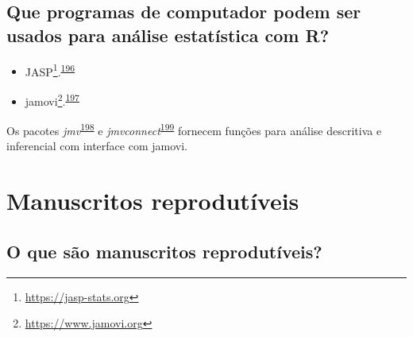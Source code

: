 \documentclass[
  a4paper,
]{book}
\renewcommand{\href}[2]{#2\footnote{\url{#1}}}
\newenvironment{infobox}[1]
  {
  \begin{itemize}
  \renewcommand{\labelitemi}{
    \raisebox{-.7\height}[0pt][0pt]{
      {\setkeys{Gin}{width=3em,keepaspectratio}
        \texttt{[image: \#1]}}
    }
  }
  \setlength{\fboxsep}{1em}
  \begin{blackbox}
  \item
  }
  {
  \end{blackbox}
  \end{itemize}
  }
\begin{document}
\hypertarget{que-programas-de-computador-podem-ser-usados-para-anuxe1lise-estatuxedstica-com-r}{%
\subsection{Que programas de computador podem ser usados para análise estatística com R?}\label{que-programas-de-computador-podem-ser-usados-para-anuxe1lise-estatuxedstica-com-r}}

\begin{itemize}
\item
  \href{https://jasp-stats.org}{JASP}.\textsuperscript{\protect\hyperlink{ref-love2019}{196}}
\item
  \href{https://www.jamovi.org}{jamovi}.\textsuperscript{\protect\hyperlink{ref-sahin2020}{197}}
\end{itemize}

\begin{infobox}{images/Rlogo}
Os pacotes \emph{jmv}\textsuperscript{\protect\hyperlink{ref-jmv}{198}} e \emph{jmvconnect}\textsuperscript{\protect\hyperlink{ref-jmvconnect}{199}} fornecem funções para análise descritiva e inferencial com interface com jamovi.

\end{infobox}

\hypertarget{relatuxf3rios-dinamicos}{%
\section{Manuscritos reprodutíveis}\label{relatuxf3rios-dinamicos}}

\hypertarget{o-que-suxe3o-manuscritos-reprodutuxedveis}{%
\subsection{O que são manuscritos reprodutíveis?}\label{o-que-suxe3o-manuscritos-reprodutuxedveis}}
\end{document}
